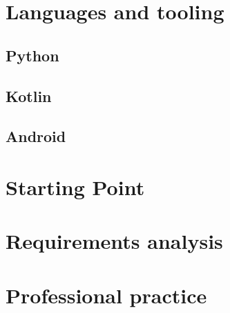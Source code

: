 \section{Languages and tooling}
\subsection{Python}
\subsection{Kotlin}
\subsection{Android}

\section{Starting Point}
\section{Requirements analysis}
\section{Professional practice}
